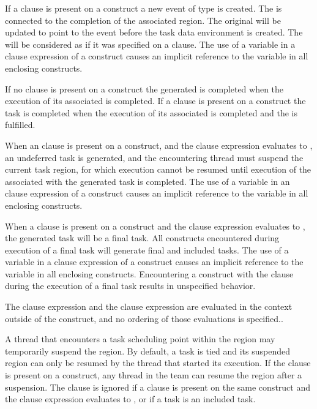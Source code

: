 If a  clause is present on a  construct a new event 
 of type  is created. The 
 is connected to the completion of the associated 
 region. The original  will be updated to point 
to the  event before the task data environment is 
created. The  will be considered as if it was specified on 
a  clause. The use of a variable in a  clause 
expression of a  construct causes an implicit reference to the 
variable in all enclosing constructs.

If no  clause is present on a  construct the generated 
 is completed when the execution of its associated 
 is completed. If a  clause is present on a 
 construct the task is completed when the execution of its associated 
 is completed and the  
is fulfilled.

When an  clause is present on a  construct, and the  
clause expression evaluates to , an undeferred task is generated, and 
the encountering thread must suspend the current task region, for which execution 
cannot be resumed until execution of the  associated with 
the generated task is completed. The use of a variable in 
an  clause expression of a  construct causes an implicit 
reference to the variable in all enclosing constructs.

When a  clause is present on a  construct and the 
 clause expression evaluates to , the generated task 
will be a final task. All  constructs encountered during execution 
of a final task will generate final and included tasks. The use of a variable 
in a  clause expression of a  construct causes an
implicit reference to the variable in all enclosing constructs. Encountering 
a  construct with the  clause during the execution 
of a final task results in unspecified behavior.

The  clause expression and the  clause expression are 
evaluated in the context outside of the  construct, and no ordering 
of those evaluations is specified..

A thread that encounters a task scheduling point within the  region 
may temporarily suspend the  region. By default, a task is tied and 
its suspended  region can only be resumed by the thread that started 
its execution. If the  clause is present on a  construct, 
any thread in the team can resume the  region after a suspension. The 
 clause is ignored if a  clause is present on the same 
 construct and the  clause expression evaluates to 
, or if a task is an included task.

